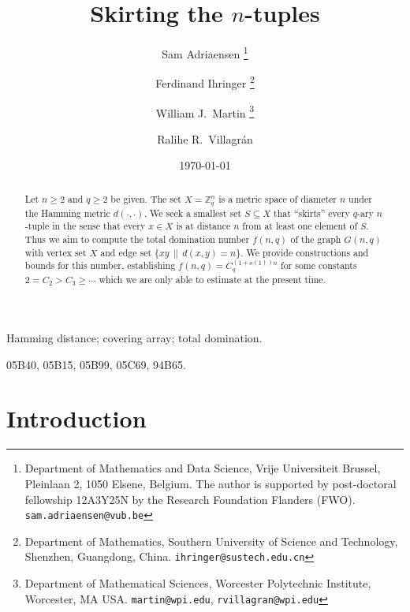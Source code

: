\documentclass[12pt,reqno]{article}
\newcommand{\ZZ}{\mathbb Z}
\begin{document}
\thispagestyle{empty}
\setcounter{page}{1}
\title{Skirting the $n$-tuples}
\author{
Sam Adriaensen
 \thanks{Department of Mathematics and Data 
Science, Vrije Universiteit Brussel, Pleinlaan 2, 
1050 Elsene, Belgium. The author is supported by post-doctoral fellowship 12A3Y25N by the Research Foundation Flanders (FWO). {\tt sam.adriaensen@vub.be}}
 \and
Ferdinand Ihringer
 \thanks{Department of Mathematics, Southern 
University of Science and Technology, Shenzhen, 
Guangdong, China. {\tt ihringer@sustech.edu.cn} }
 \and
William J.~Martin
 \thanks{Department of Mathematical Sciences,
Worcester Polytechnic Institute, Worcester, MA USA. {\tt  martin@wpi.edu}, {\tt  rvillagran@wpi.edu} }
 \and
Ralihe R.~Villagr\'an
 \footnotemark[3]
 } 


\date{\today} 
\maketitle




\medskip

\begin{abstract}
Let $n\ge 2$ and $q\ge 2$ be given. The set $X = \ZZ_q^n$ is a metric space 
of diameter $n$ under the Hamming metric $d(\cdot,\cdot)$.  We seek a smallest 
set $S\subseteq X$ that ``skirts'' every $q$-ary $n$-tuple in the sense that 
every $x\in X$ is at distance $n$ from at least one element of $S$. Thus we aim 
to compute the total domination number $f(n,q)$ of the graph $G(n,q)$  with vertex set 
$X$ and edge set $\{ xy \, \| \, d(x,y)=n\}$. We provide constructions and bounds for this 
number, establishing $f(n,q) = C_q^{(1+o(1))n}$ for some constants $2=C_2>C_3 \geq \cdots$
which we are only able to estimate at the present time.
\end{abstract}


 Hamming distance; covering array; total domination.

 05B40, 05B15, 05B99, 05C69, 94B65.


%
%
\section{Introduction}
\label{Sec:intro}
\end{document}
